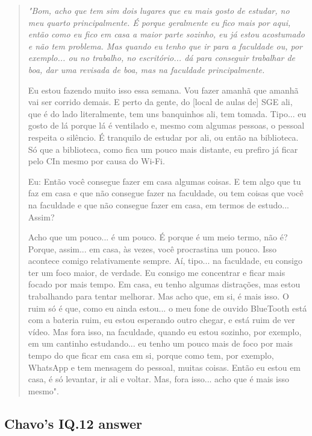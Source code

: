 \begin{quote}
    \itshape
    "Bom, acho que tem sim dois lugares que eu mais gosto de estudar, no meu quarto principalmente. É porque geralmente eu fico mais por aqui, então como eu fico em casa a maior parte sozinho, eu já estou acostumado e não tem problema. Mas quando eu tenho que ir para a faculdade ou, por exemplo... ou no trabalho, no escritório... dá para conseguir trabalhar de boa, dar uma revisada de boa, mas na faculdade principalmente. 
    
    Eu estou fazendo muito isso essa semana. Vou fazer amanhã que amanhã vai ser corrido demais. E perto da gente, do [local de aulas de] SGE ali, que é do lado literalmente, tem uns banquinhos ali, tem tomada. Tipo... eu gosto de lá porque lá é ventilado e, mesmo com algumas pessoas, o pessoal respeita o silêncio.     É tranquilo de estudar por ali, ou então na biblioteca. Só que a biblioteca, como fica um pouco mais distante, eu prefiro já ficar pelo \gls{CIn} mesmo por causa do Wi-Fi.
    

    \colorbox{black!15}{Eu: Então você consegue fazer em casa algumas coisas. E tem algo que tu faz em}
    \colorbox{black!15}{casa e que não consegue fazer na faculdade, ou tem coisas que você na faculdade}
    \colorbox{black!15}{e que não consegue fazer em casa, em termos de estudo... Assim?}
    
    Acho que um pouco... é um pouco. É porque é um meio termo, não é? Porque, assim... em casa, às vezes, você procrastina um pouco. Isso acontece comigo relativamente sempre. Aí, tipo... na faculdade, eu consigo ter um foco maior, de verdade. Eu consigo me concentrar e ficar mais focado por mais tempo. Em casa, eu tenho algumas distrações, mas estou trabalhando para tentar melhorar. Mas acho que, em si, é mais isso. O ruim só é que, como eu ainda estou... o meu fone de ouvido BlueTooth está com a bateria ruim, eu estou esperando outro chegar, e está ruim de ver vídeo. Mas fora isso, na faculdade, quando eu estou sozinho, por exemplo, em um cantinho estudando... eu tenho um pouco mais de foco por mais tempo do que ficar em casa em si, porque como tem, por exemplo, WhatsApp e tem mensagem do pessoal, muitas coisas. Então eu estou em casa, é só levantar, ir ali e voltar. Mas, fora isso... acho que é mais isso mesmo".
\end{quote}
\subsection{Chavo’s IQ.12 answer}
\label{interview-exc-ss:chavo-iq12}

